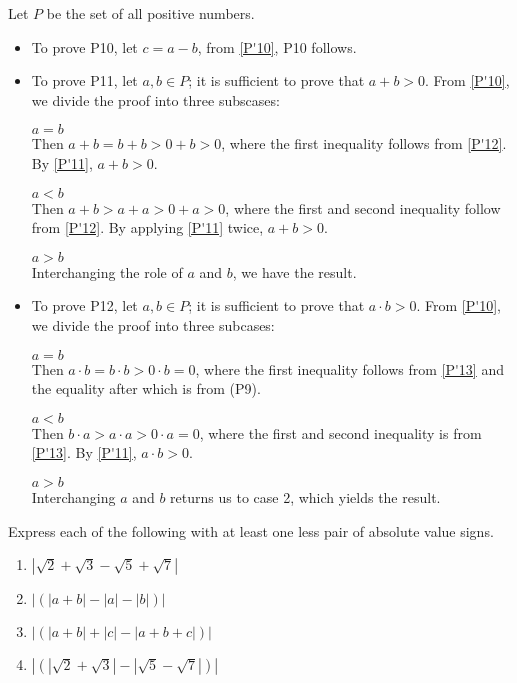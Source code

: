 \begin{solution}
  Let $P$ be the set of all positive numbers.
  \begin{itemize}
    \item To prove P10, let $c=a-b$, from \ref{P'10}, P10
    follows.
    \item To prove P11, let $a,b\in P$; it is
    sufficient to prove that $a+b>0$. From \ref{P'10},
    we divide the proof into three subscases:\par
    $a=b$ \\
    Then $a+b=b+b>0+b>0$, where the first inequality follows
    from \ref{P'12}. By \ref{P'11}, $a+b>0$.\par
    $a<b$ \\
    Then $a+b>a+a>0+a>0$, where the first and second inequality
    follow from \ref{P'12}. By applying \ref{P'11} twice,
    $a+b>0$. \par
    $a>b$ \\
    Interchanging the role of $a$ and $b$, we have the result.
    \item To prove P12, let $a,b\in P$; it is
    sufficient to prove that $a\cdot b>0$. From \ref{P'10},
    we divide the proof into three subcases:\par
    $a=b$ \\
    Then $a\cdot b=b\cdot b>0\cdot b=0$, where the first
    inequality follows from \ref{P'13} and the equality after
    which is from (P9).\par
    $a<b$ \\
    Then $b\cdot a>a\cdot a>0\cdot a=0$, where the first
    and second inequality is from \ref{P'13}. By \ref{P'11},
    $a\cdot b>0$. \par
    $a>b$ \\
    Interchanging $a$ and $b$ returns us to case 2, which
    yields the result.
  \end{itemize}
\end{solution}

\begin{pr}
  Express each of the following with at least one less pair
  of absolute value signs.
  \begin{enumerate}[label=(\roman*)]
    \item $|\sqrt{2}+\sqrt{3}-\sqrt{5}+\sqrt{7}|$
    \item $|(|a+b|-|a|-|b|)|$
    \item $|(|a+b|+|c|-|a+b+c|)|$
    \item $|(|\sqrt{2}+\sqrt{3}|-|\sqrt{5}-\sqrt{7}|)|$
  \end{enumerate}
\end{pr}

